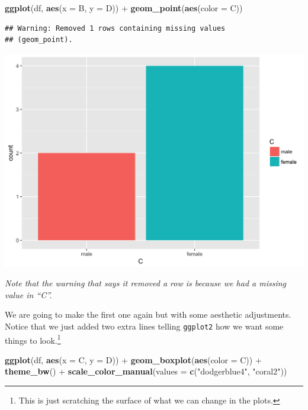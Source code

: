 \documentclass[]{tufte-book}
\newenvironment{Shaded}{}{}
\newcommand{\KeywordTok}[1]{\textcolor[rgb]{0.00,0.44,0.13}{\textbf{#1}}}
\newcommand{\DataTypeTok}[1]{\textcolor[rgb]{0.56,0.13,0.00}{#1}}
\newcommand{\StringTok}[1]{\textcolor[rgb]{0.25,0.44,0.63}{#1}}
\newcommand{\OperatorTok}[1]{\textcolor[rgb]{0.40,0.40,0.40}{#1}}
\newcommand{\NormalTok}[1]{#1}
\theoremstyle{definition}
\theoremstyle{definition}
\theoremstyle{remark}
\begin{document}
\begin{Shaded}
\begin{Highlighting}[]
\KeywordTok{ggplot}\NormalTok{(df, }\KeywordTok{aes}\NormalTok{(}\DataTypeTok{x =}\NormalTok{ B, }\DataTypeTok{y =}\NormalTok{ D)) }\OperatorTok{+}\StringTok{ }\KeywordTok{geom_point}\NormalTok{(}\KeywordTok{aes}\NormalTok{(}\DataTypeTok{color =}\NormalTok{ C))}
\end{Highlighting}
\end{Shaded}

\begin{verbatim}
## Warning: Removed 1 rows containing missing values
## (geom_point).
\end{verbatim}

\includegraphics{_main_files/figure-latex/unnamed-chunk-59-1}

\emph{Note that the warning that says it removed a row is because we had
a missing value in ``C''.}

We are going to make the first one again but with some aesthetic
adjustments. Notice that we just added two extra lines telling
\texttt{ggplot2} how we want some things to look.\footnote{This is just
  scratching the surface of what we can change in the plots.}

\begin{Shaded}
\begin{Highlighting}[]
\KeywordTok{ggplot}\NormalTok{(df, }\KeywordTok{aes}\NormalTok{(}\DataTypeTok{x =}\NormalTok{ C, }\DataTypeTok{y =}\NormalTok{ D)) }\OperatorTok{+}\StringTok{ }\KeywordTok{geom_boxplot}\NormalTok{(}\KeywordTok{aes}\NormalTok{(}\DataTypeTok{color =}\NormalTok{ C)) }\OperatorTok{+}\StringTok{ }
\StringTok{    }\KeywordTok{theme_bw}\NormalTok{() }\OperatorTok{+}\StringTok{ }\KeywordTok{scale_color_manual}\NormalTok{(}\DataTypeTok{values =} \KeywordTok{c}\NormalTok{(}\StringTok{"dodgerblue4"}\NormalTok{, }
    \StringTok{"coral2"}\NormalTok{))}
\end{Highlighting}
\end{Shaded}
\end{document}
